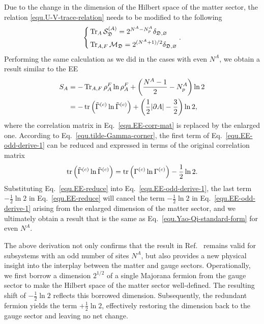 Due to the change in the dimension of the Hilbert space of the matter sector, the relation \eqref{equ.U-V-trace-relation} needs to be modified to the following
\begin{equation}\label{equ.U-V-trace-relation-odd}
    \left\{
\begin{aligned}
&\Tr_{A} \mathcal{S}^{(A)}_{\mathfrak{D}} = 2^{N^A-N^A_p}\delta_{\mathfrak{D},\varnothing} \\
& \Tr_{A,F} \mathcal{M}_{\mathfrak{D}} = 2^{(N^A+1)/2}\delta_{\mathfrak{D},\varnothing}
\end{aligned}
\right..
\end{equation}
Performing the same calculation as we did in the cases with even $N^A$, we obtain a result similar to the EE 
\begin{align}\label{equ.EE-odd-derive-1}
    S_A &= -\Tr_{A,F} \rho^F_A\ln\rho^F_A + \left( \frac{N^A-1}{2}-N^A_p \right)\ln 2 \nonumber\\
    &= -\tr\left( \Tilde{\Gamma}^{(c)}\ln \Tilde{\Gamma}^{(c)} \right) + \left( \frac{1}{2}\abs{\partial A} - \frac{3}{2} \right)\ln 2,
\end{align}
where the correlation matrix in Eq.~\eqref{equ.EE-corr-mat} is replaced by the enlarged one. According to Eq.~\eqref{equ.tilde-Gamma-corner}, the first term of Eq.~\eqref{equ.EE-odd-derive-1} can be reduced and expressed in terms of the original correlation matrix 
\begin{equation}\label{equ.EE-reduce}
    \tr\left( \Tilde{\Gamma}^{(c)} \ln \Tilde{\Gamma}^{(c)} \right) = \tr\left( \Gamma^{(c)} \ln \Gamma^{(c)} \right) - \frac{1}{2}\ln 2 .
\end{equation}
Substituting Eq.~\eqref{equ.EE-reduce} into Eq.~\eqref{equ.EE-odd-derive-1}, the last term $-\frac{1}{2}\ln 2$ in Eq.~\eqref{equ.EE-reduce} will cancel the term $-\frac{1}{2}\ln 2$ in Eq.~\eqref{equ.EE-odd-derive-1} arising from the enlarged dimension of the matter sector, and we ultimately obtain a result that is the same as Eq.~\eqref{equ.Yao-Qi-standard-form} for even $N^A$. 

The above derivation not only confirms that the result in Ref.~\cite{Yao-Qi_2010} remains valid for subsystems with an odd number of sites $N^A$, but also provides a new physical insight into the interplay between the matter and gauge sectors. Operationally, we first borrow a dimension $2^{1/2}$ of a single Majorana fermion from the gauge sector to make the Hilbert space of the matter sector well-defined. The resulting shift of $-\frac{1}{2}\ln 2$ reflects this borrowed dimension. Subsequently, the redundant fermion yields the term $+\frac{1}{2}\ln 2$, effectively restoring the dimension back to the gauge sector and leaving no net change. 

